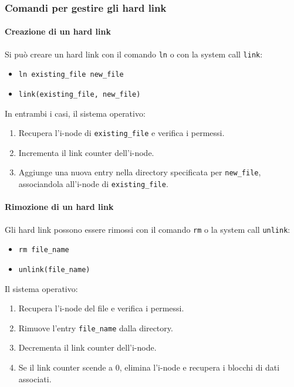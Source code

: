 \subsubsection{Comandi per gestire gli hard link}
\paragraph{Creazione di un hard link}
Si può creare un hard link con il comando \texttt{ln} o con la system call \texttt{link}:
\begin{itemize}
    \item \texttt{ln existing\_file new\_file}
    \item \texttt{link(existing\_file, new\_file)}
\end{itemize}
In entrambi i casi, il sistema operativo:
\begin{enumerate}
    \item Recupera l'i-node di \texttt{existing\_file} e verifica i permessi.
    \item Incrementa il link counter dell'i-node.
    \item Aggiunge una nuova entry nella directory specificata per \texttt{new\_file}, associandola all'i-node di \texttt{existing\_file}.
\end{enumerate}

\paragraph{Rimozione di un hard link}
Gli hard link possono essere rimossi con il comando \texttt{rm} o la system call \texttt{unlink}:
\begin{itemize}
    \item \texttt{rm file\_name}
    \item \texttt{unlink(file\_name)}
\end{itemize}
Il sistema operativo:
\begin{enumerate}
    \item Recupera l'i-node del file e verifica i permessi.
    \item Rimuove l'entry \texttt{file\_name} dalla directory.
    \item Decrementa il link counter dell'i-node.
    \item Se il link counter scende a 0, elimina l'i-node e recupera i blocchi di dati associati.
\end{enumerate}


